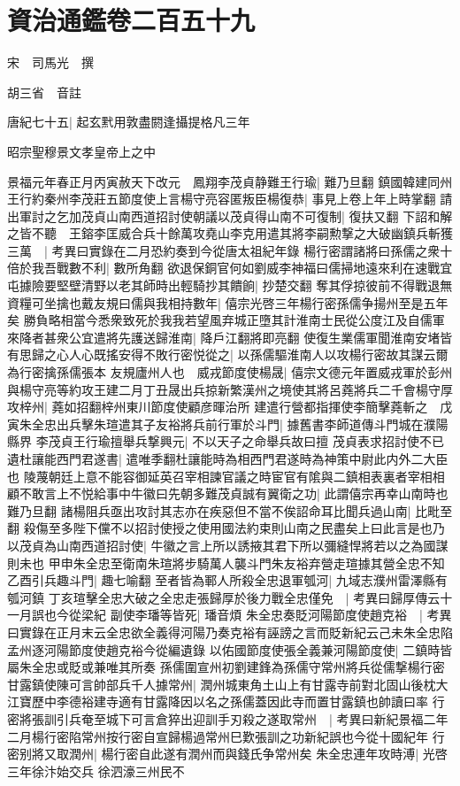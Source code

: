 \section{資治通鑑卷二百五十九}
宋　司馬光　撰

胡三省　音註

唐紀七十五|{
	起玄黓用敦盡閼逢攝提格凡三年}


昭宗聖穆景文孝皇帝上之中

景福元年春正月丙寅赦天下改元　鳳翔李茂貞静難王行瑜|{
	難乃旦翻}
鎮國韓建同州王行約秦州李茂莊五節度使上言楊守亮容匿叛臣楊復恭|{
	事見上卷上年上時掌翻}
請出軍討之乞加茂貞山南西道招討使朝議以茂貞得山南不可復制|{
	復扶又翻}
下詔和解之皆不聽　王鎔李匡威合兵十餘萬攻堯山李克用遣其將李嗣勲撃之大破幽鎮兵斬獲三萬　|{
	考異曰實錄在二月恐約奏到今從唐太祖紀年錄}
楊行密謂諸將曰孫儒之衆十倍於我吾戰數不利|{
	數所角翻}
欲退保銅官何如劉威李神福曰儒掃地遠來利在速戰宜屯據險要堅壁清野以老其師時出輕騎抄其饋餉|{
	抄楚交翻}
奪其俘掠彼前不得戰退無資糧可坐擒也戴友規曰儒與我相持數年|{
	僖宗光啓三年楊行密孫儒争揚州至是五年矣}
勝負略相當今悉衆致死於我我若望風弃城正墮其計淮南士民從公度江及自儒軍來降者甚衆公宜遣將先護送歸淮南|{
	降戶江翻將即亮翻}
使復生業儒軍聞淮南安堵皆有思歸之心人心既搖安得不敗行密悦從之|{
	以孫儒驅淮南人以攻楊行密故其謀云爾為行密擒孫儒張本}
友規廬州人也　威戎節度使楊晟|{
	僖宗文德元年置威戎軍於彭州}
與楊守亮等約攻王建二月丁丑晟出兵掠新繁漢州之境使其將呂蕘將兵二千會楊守厚攻梓州|{
	蕘如招翻梓州東川節度使顧彦暉治所}
建遣行營都指揮使李簡擊蕘斬之　戊寅朱全忠出兵擊朱瑄遣其子友裕將兵前行軍於斗門|{
	據舊書李師道傳斗門城在濮陽縣界}
李茂貞王行瑜擅舉兵撃興元|{
	不以天子之命舉兵故曰擅}
茂貞表求招討使不已遺杜讓能西門君遂書|{
	遣唯季翻杜讓能時為相西門君遂時為神策中尉此内外二大臣也}
陵蔑朝廷上意不能容御延英召宰相諫官議之時宦官有隂與二鎮相表裏者宰相相顧不敢言上不悦給事中牛徽曰先朝多難茂貞誠有翼衛之功|{
	此謂僖宗再幸山南時也難乃旦翻}
諸楊阻兵亟出攻討其志亦在疾惡但不當不俟詔命耳比聞兵過山南|{
	比毗至翻}
殺傷至多陛下儻不以招討使授之使用國法約束則山南之民盡矣上曰此言是也乃以茂貞為山南西道招討使|{
	牛徽之言上所以誘掖其君下所以彌縫悍將若以之為國謀則未也}
甲申朱全忠至衛南朱瑄將步騎萬人襲斗門朱友裕弃營走瑄據其營全忠不知乙酉引兵趣斗門|{
	趣七喻翻}
至者皆為鄆人所殺全忠退軍瓠河|{
	九域志濮州雷澤縣有瓠河鎮}
丁亥瑄擊全忠大破之全忠走張歸厚於後力戰全忠僅免　|{
	考異曰歸厚傳云十一月誤也今從梁紀}
副使李璠等皆死|{
	璠音煩}
朱全忠奏貶河陽節度使趙克裕　|{
	考異曰實錄在正月末云全忠欲全義得河陽乃奏克裕有誣謗之言而貶新紀云己未朱全忠陷孟州逐河陽節度使趙克裕今從編遺錄}
以佑國節度使張全義兼河陽節度使|{
	二鎮時皆屬朱全忠或貶或兼唯其所奏}
孫儒圍宣州初劉建鋒為孫儒守常州將兵從儒撃楊行密甘露鎮使陳可言帥部兵千人據常州|{
	潤州城東角土山上有甘露寺前對北固山後枕大江寶歷中李德裕建寺適有甘露降因以名之孫儒蓋因此寺而置甘露鎮也帥讀曰率}
行密將張訓引兵奄至城下可言倉猝出迎訓手刃殺之遂取常州　|{
	考異曰新紀景福二年二月楊行密陷常州按行密自宣歸楊過常州巳歎張訓之功新紀誤也今從十國紀年}
行密别將又取潤州|{
	楊行密自此遂有潤州而與錢氏争常州矣}
朱全忠連年攻時溥|{
	光啓三年徐汴始交兵}
徐泗濠三州民不

